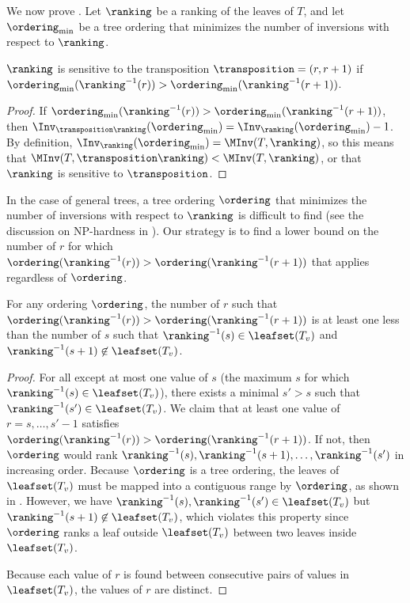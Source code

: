 We now prove . Let $\ranking$ be a ranking of the leaves of $T$, and let $\ordering_{\min}$ be a tree ordering that minimizes the number of inversions with respect to $\ranking$.

\begin{claim}
    \label{claim:k-ary:decreasing-transposition}
    $\ranking$ is sensitive to the transposition $\transposition=(r,r+1)$ if $\ordering_{\min}(\ranking^{-1}(r))>\ordering_{\min}(\ranking^{-1}(r+1))$.
\end{claim}

\begin{proof}
    If $\ordering_{\min}(\ranking^{-1}(r))>\ordering_{\min}(\ranking^{-1}(r+1))$, then $\Inv_{\transposition \ranking}(\ordering_{\min})=\Inv_{\ranking}(\ordering_{\min})-1$. By definition, $\Inv_{\ranking}(\ordering_{\min})=\MInv(T,\ranking)$, so this means that $\MInv(T,\transposition \ranking)< \MInv(T,\ranking)$, or that $\ranking$ is sensitive to $\transposition$.
\end{proof}

In the case of general trees, a tree ordering $\ordering$ that minimizes the number of inversions with respect to $\ranking$ is difficult to find (see the discussion on NP-hardness in ). Our strategy is to find a lower bound on the number of $r$ for which $\ordering(\ranking^{-1}(r))>\ordering(\ranking^{-1}(r+1))$ that applies regardless of $\ordering$.

\begin{claim}
    \label{claim:k-ary:transposition-to-gap}
    For any ordering $\ordering$, the number of $r$ such that $\ordering(\ranking^{-1}(r))>\ordering(\ranking^{-1}(r+1))$ is at least one less than the number of $s$ such that $\ranking^{-1}(s)\in \leafset(T_v)$ and $\ranking^{-1}(s+1)\not\in \leafset(T_v)$.
\end{claim}

\begin{proof}
    For all except at most one value of $s$ (the maximum $s$ for which $\ranking^{-1}(s)\in \leafset(T_v)$), there exists a minimal $s'>s$ such that $\ranking^{-1}(s')\in \leafset(T_v)$. We claim that at least one value of $r=s,\dots,s'-1$ satisfies $\ordering(\ranking^{-1}(r))>\ordering(\ranking^{-1}(r+1))$. If not, then $\ordering$ would rank $\ranking^{-1}(s),\ranking^{-1}(s+1),\dots,\ranking^{-1}(s')$ in increasing order. Because $\ordering$ is a tree ordering, the leaves of $\leafset(T_v)$ must be mapped into a contiguous range by $\ordering$, as shown in . However, we have $\ranking^{-1}(s),\ranking^{-1}(s')\in \leafset(T_v)$ but $\ranking^{-1}(s+1)\not\in \leafset(T_v)$, which violates this property since $\ordering$ ranks a leaf outside $\leafset(T_v)$ between two leaves inside $\leafset(T_v)$.
    
    Because each value of $r$ is found between consecutive pairs of values in $\leafset(T_v)$, the values of $r$ are distinct.
\end{proof}

